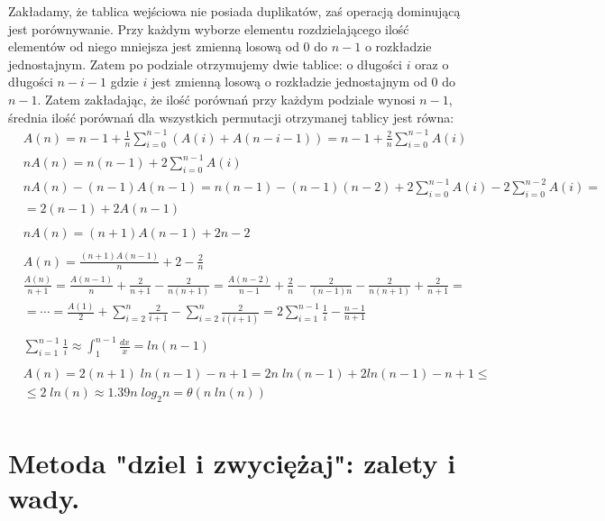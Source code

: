 \documentclass[main.tex]{subfiles}
\begin{document}
    Zakładamy, że tablica wejściowa nie posiada duplikatów, zaś operacją dominującą jest porównywanie.
    Przy każdym wyborze elementu rozdzielającego ilość elementów od niego mniejsza jest zmienną losową od 0 do $n - 1$ o rozkładzie jednostajnym.
    Zatem po podziale otrzymujemy dwie tablice: o długości $i$ oraz o długości $n - i - 1$ gdzie $i$ jest zmienną losową o rozkładzie jednostajnym od 0 do $n - 1$.
    Zatem zakładając, że ilość porównań przy każdym podziale wynosi $n - 1$, średnia ilość porównań dla wszystkich permutacji otrzymanej tablicy jest równa:
    \begin{align*}
        &A(n) = n - 1 + \frac{1}{n}\sum_{i = 0}^{n - 1}(A(i) + A(n - i - 1)) =
        n - 1 + \frac{2}{n}\sum_{i = 0}^{n - 1}A(i)\\
        &nA(n) = n(n - 1) + 2 \sum_{i = 0}^{n - 1}A(i)\\
        &nA(n) - (n - 1)A(n-1) = n(n - 1) - (n - 1)(n - 2) + 2\sum_{i = 0}^{n - 1}A(i) - 2\sum_{i = 0}^{n - 2}A(i) =\\
        &= 2(n - 1) + 2A(n - 1)\\
        &\\
        &nA(n) = (n + 1)A(n - 1) + 2n - 2\\
        &\\
        &A(n) = \frac{(n + 1)A(n - 1)}{n} + 2 - \frac{2}{n}\\
        &\frac{A(n)}{n + 1} = \frac{A(n - 1)}{n} + \frac{2}{n + 1} - \frac{2}{n(n + 1)}
        = \frac{A(n - 2)}{n - 1} + \frac{2}{n} - \frac{2}{(n - 1)n} - \frac{2}{n(n + 1)} + \frac{2}{n + 1} =\\
        &= \cdots = \frac{A(1)}{2} + \sum_{i = 2}^n \frac{2}{i + 1} - \sum_{i = 2}^n \frac{2}{i(i + 1)} =
        2\sum_{i = 1}^{n - 1} \frac{1}{i} - \frac{n - 1}{n + 1}\\
        &\\
        &\sum_{i = 1}^{n - 1} \frac{1}{i} \approx \int_1^{n - 1}\frac{dx}{x} = ln(n - 1)\\
        &\\
        &A(n) = 2(n + 1)\;ln(n - 1) - n + 1 = 2n\;ln(n - 1) + 2ln(n - 1) - n + 1 \leq\\
        &\leq 2\;ln(n) \approx 1.39 n \; log_2 n = \theta(n\;ln(n))\\
    \end{align*}

    \newpage


    \section{Metoda "dziel i zwyciężaj": zalety i wady.}
\end{document}

